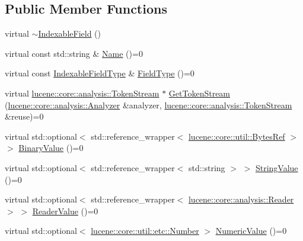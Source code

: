 \subsection*{Public Member Functions}
\begin{DoxyCompactItemize}
\item 
virtual \mbox{\hyperlink{classlucene_1_1core_1_1index_1_1IndexableField_ab396dd630f47c4671bc47788ae19175b}{$\sim$\+Indexable\+Field}} ()
\item 
virtual const std\+::string \& \mbox{\hyperlink{classlucene_1_1core_1_1index_1_1IndexableField_a3eddf99b22a00458195e80429fa5ca82}{Name}} ()=0
\item 
virtual const \mbox{\hyperlink{classlucene_1_1core_1_1index_1_1IndexableFieldType}{Indexable\+Field\+Type}} \& \mbox{\hyperlink{classlucene_1_1core_1_1index_1_1IndexableField_a008a8b0a96618b1600ad2b44e9357451}{Field\+Type}} ()=0
\item 
virtual \mbox{\hyperlink{classlucene_1_1core_1_1analysis_1_1TokenStream}{lucene\+::core\+::analysis\+::\+Token\+Stream}} $\ast$ \mbox{\hyperlink{classlucene_1_1core_1_1index_1_1IndexableField_a9df5c2708bdb7936a7e070ee9866ee27}{Get\+Token\+Stream}} (\mbox{\hyperlink{classlucene_1_1core_1_1analysis_1_1Analyzer}{lucene\+::core\+::analysis\+::\+Analyzer}} \&analyzer, \mbox{\hyperlink{classlucene_1_1core_1_1analysis_1_1TokenStream}{lucene\+::core\+::analysis\+::\+Token\+Stream}} \&reuse)=0
\item 
virtual std\+::optional$<$ std\+::reference\+\_\+wrapper$<$ \mbox{\hyperlink{classlucene_1_1core_1_1util_1_1BytesRef}{lucene\+::core\+::util\+::\+Bytes\+Ref}} $>$ $>$ \mbox{\hyperlink{classlucene_1_1core_1_1index_1_1IndexableField_a77b0b5e4f1ae25eaaab3d9f13b9204cb}{Binary\+Value}} ()=0
\item 
virtual std\+::optional$<$ std\+::reference\+\_\+wrapper$<$ std\+::string $>$ $>$ \mbox{\hyperlink{classlucene_1_1core_1_1index_1_1IndexableField_ac06f4371ff3011ab247a07e219f43223}{String\+Value}} ()=0
\item 
virtual std\+::optional$<$ std\+::reference\+\_\+wrapper$<$ \mbox{\hyperlink{classlucene_1_1core_1_1analysis_1_1Reader}{lucene\+::core\+::analysis\+::\+Reader}} $>$ $>$ \mbox{\hyperlink{classlucene_1_1core_1_1index_1_1IndexableField_a5d1bcc66e1f03e2ce8c328302a735486}{Reader\+Value}} ()=0
\item 
virtual std\+::optional$<$ \mbox{\hyperlink{classlucene_1_1core_1_1util_1_1etc_1_1Number}{lucene\+::core\+::util\+::etc\+::\+Number}} $>$ \mbox{\hyperlink{classlucene_1_1core_1_1index_1_1IndexableField_ad57489328069fd1e227a0b1489159b85}{Numeric\+Value}} ()=0
\end{DoxyCompactItemize}


